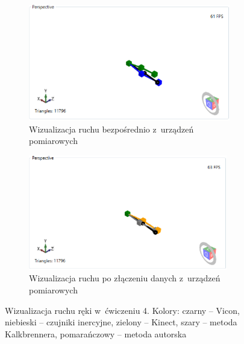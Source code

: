 \begin{figure}[!htb]
	\captionsetup{singlelinecheck=off}
	\centering
	\begin{subfigure}[b]{0.49\textwidth}
		\centering
		\includegraphics[width=\linewidth]{images/400/raw.png}	
		\caption{Wizualizacja ruchu bezpośrednio z~urządzeń pomiarowych}
		\label{fig:experiments:four:raw}
	\end{subfigure}
					
	\begin{subfigure}[b]{0.49\textwidth}
		\centering
		\includegraphics[width=\linewidth]{images/400/Fused.png}		
		\caption{Wizualizacja ruchu po złączeniu danych z~urządzeń pomiarowych}
		\label{fig:experiments:four:fused}	
	\end{subfigure}
				
	\caption{Wizualizacja ruchu ręki w~ćwiczeniu 4.  Kolory: czarny -- Vicon, niebieski -- czujniki inercyjne, zielony -- Kinect, szary -- metoda Kalkbrennera, pomarańczowy -- metoda autorska}	
	\label{fig:experiments:four}
\end{figure}

